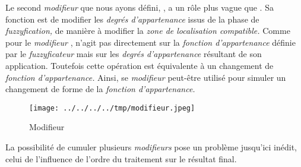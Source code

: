 Le second \emph{modifieur} que nous ayons défini, , a
un rôle plus vague que . Sa fonction est de modifier les
\emph{degrés d'appartenance} issus de la phase de
\emph{fuzzyfication,} de manière à modifier la \emph{zone de
  localisation compatible.} Comme pour le \emph{modifieur} ,
 n'agit pas directement sur la \emph{fonction
  d'appartenance} définie par le \emph{fuzzyficateur} mais sur les
\emph{degrés d'appartenance} résultant de son application. Toutefois
cette opération est équivalente à un changement de \emph{fonction
  d'appartenance.} Ainsi, se \emph{modifieur} peut-être utilisé pour
simuler un changement de forme de la \emph{fonction d'appartenance.}

\begin{figure}
  \centering
  \texttt{[image: ../../../../tmp/modifieur.jpeg]}
  \caption{Modifieur}
  \label{fig:methode_modifieur}
\end{figure}

La possibilité de cumuler plusieurs \emph{modifieurs} pose un problème
jusqu'ici inédit, celui de l'influence de l'ordre du traitement sur le
résultat final.

